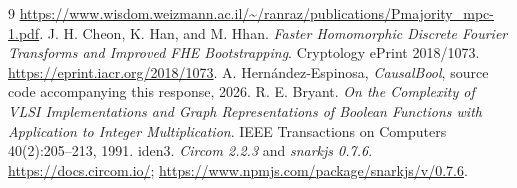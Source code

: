\documentclass[11pt,a4paper]{article}
\begin{document}
\begin{thebibliography}{9}
\url{https://www.wisdom.weizmann.ac.il/~/ranraz/publications/Pmajority_mpc-1.pdf}.
 J. H. Cheon, K. Han, and M. Hhan.
\emph{Faster Homomorphic Discrete Fourier Transforms and Improved FHE
Bootstrapping}. Cryptology ePrint 2018/1073.
\url{https://eprint.iacr.org/2018/1073}.
 A. Hernández-Espinosa, \emph{CausalBool}, source code
accompanying this response, 2026.
 R. E. Bryant. \emph{On the Complexity of VLSI Implementations
and Graph Representations of Boolean Functions with Application to Integer
Multiplication}. IEEE Transactions on Computers 40(2):205--213, 1991.
 iden3. \emph{Circom 2.2.3} and \emph{snarkjs 0.7.6}.
\url{https://docs.circom.io/};
\url{https://www.npmjs.com/package/snarkjs/v/0.7.6}.
\end{thebibliography}
\end{document}
